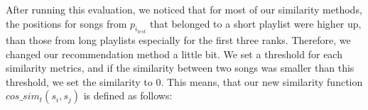 After running this evaluation, we noticed that for most of our similarity methods, the positions for songs from $p_{i_{test}} $ that belonged to a short playlist were higher up, than those from long playlists especially for the first three ranks. Therefore, we changed our recommendation method a little bit. We set a threshold for each similarity metrics, and if the similarity between two songs was smaller than this threshold, we set the similarity to 0. This means, that our new similarity function $cos\_sim_t(s_i,s_j)$ is defined as follows:
 
